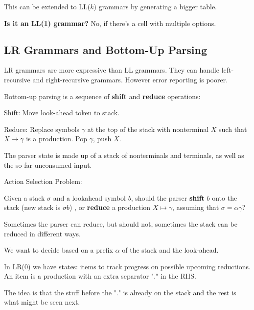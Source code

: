 This can be extended to LL($k$) grammars by generating a bigger table.

\textbf{Is it an LL(1) grammar?} No, if there's a cell with multiple options.

\subsection*{LR Grammars and Bottom-Up Parsing}

LR grammars are more expressive than LL grammars. They can handle left-recursive and right-recursive grammars. However error reporting is poorer. \medskip

Bottom-up parsing is a sequence of \textbf{shift} and \textbf{reduce} operations:
\begin{compactitem}[$\quad\bullet$]
	\item Shift: Move look-ahead token to stack.

	\item Reduce: Replace symbols $\gamma$ at the top of the stack with nonterminal $X$ such that $X \to \gamma$ is a production. Pop $\gamma$, push $X$.
\end{compactitem}

The parser state is made up of a stack of nonterminals and terminals, as well as the so far unconsumed input.\medskip

Action Selection Problem:
\begin{compactitem}[$\quad\bullet$]
	\item Given a stack $\sigma$ and a lookahead symbol $b$, should the parser \textbf{shift} $b$ onto the stack (new stack is $\sigma b$) , or \textbf{reduce} a production $X \mapsto \gamma$, assuming that $\sigma = \alpha \gamma$?

	\item Sometimes the parser can reduce, but should not, sometimes the stack can be reduced in different ways.
\end{compactitem}

We want to decide based on a prefix $\alpha$ of the stack and the look-ahead. \medskip

In LR(0) we have states: items to track progress on possible upcoming reductions. An item is a production with an extra separator "." in the RHS. \medskip

The idea is that the stuff before the "." is already on the stack and the rest is what might be seen next. \medskip


